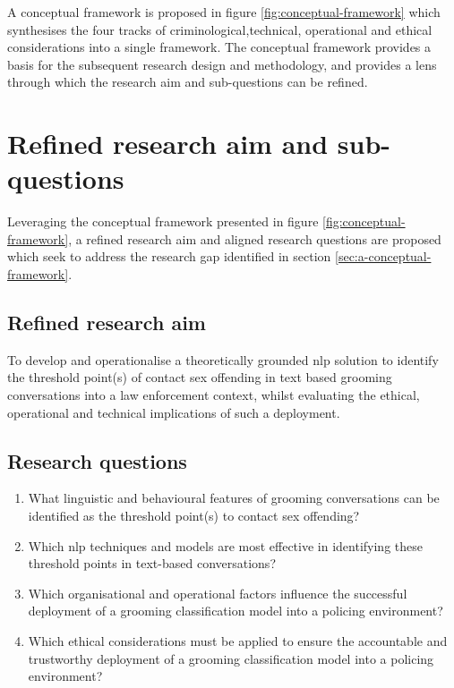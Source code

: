\documentclass[12pt,a4paper,oneside]{report}
\begin{document}
A conceptual framework is proposed in figure \ref{fig:conceptual-framework} which synthesises the four tracks of criminological,technical, operational and ethical considerations into a single framework.  The conceptual framework provides a basis for the subsequent research design and methodology, and provides a lens through which the research aim and sub-questions can be refined.

\section{Refined research aim and sub-questions}
\label{sec:refined-research-aim-and-sub-questions}
Leveraging the conceptual framework presented in figure \ref{fig:conceptual-framework}, a refined research aim and aligned research questions are proposed which seek to address the research gap identified in section \ref{sec:a-conceptual-framework}.

\subsection*{Refined research aim}
To develop and operationalise a theoretically grounded \gls{nlp} solution to identify the threshold point(s) of contact sex offending in text based grooming conversations into a law enforcement context, whilst evaluating the ethical, operational and technical implications of such a deployment.

\subsection*{Research questions}
\begin{enumerate}
    \item What linguistic and behavioural features of grooming conversations can be identified as the threshold point(s) to contact sex offending?
    \item Which \gls{nlp} techniques and models are most effective in identifying these threshold points in text-based conversations?
    \item Which organisational and operational factors influence the successful deployment of a grooming classification model into a policing environment?
    \item Which ethical considerations must be applied to ensure the accountable and trustworthy deployment of a grooming classification model into a policing environment?
\end{enumerate}
\end{document}
